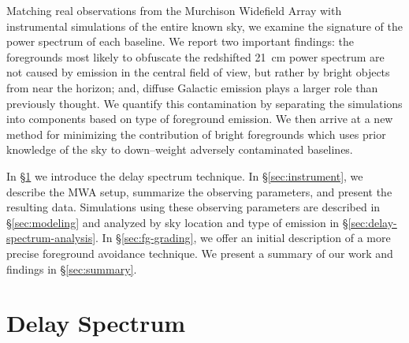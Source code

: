 \documentclass[preprint2,iop,numberedappendix]{emulateapj}
\begin{document}
Matching real observations from the Murchison Widefield Array with instrumental simulations of the entire known sky, we examine the signature of the power spectrum of each baseline. We report two important findings: the foregrounds most likely to obfuscate the redshifted 21~cm power spectrum are not caused by emission in the central field of view, but rather by bright objects from near the horizon; and, diffuse Galactic emission plays a larger role than previously thought. %
We quantify this contamination by separating the simulations into components based on type of foreground emission. We then arrive at a new method for minimizing the contribution of bright foregrounds which uses prior knowledge of the sky to down--weight adversely contaminated baselines.

In \S\ref{sec:delay-spectrum} we introduce the delay spectrum technique. In \S\ref{sec:instrument}, we describe the MWA setup, summarize the observing parameters, and present the resulting data. Simulations using these observing parameters are described in \S\ref{sec:modeling} and analyzed by sky location and type of emission in \S\ref{sec:delay-spectrum-analysis}. In \S\ref{sec:fg-grading}, we offer an initial description of a more precise foreground avoidance technique. We present a summary of our work and findings in \S\ref{sec:summary}.

\section{Delay Spectrum}\label{sec:delay-spectrum}
\end{document}
